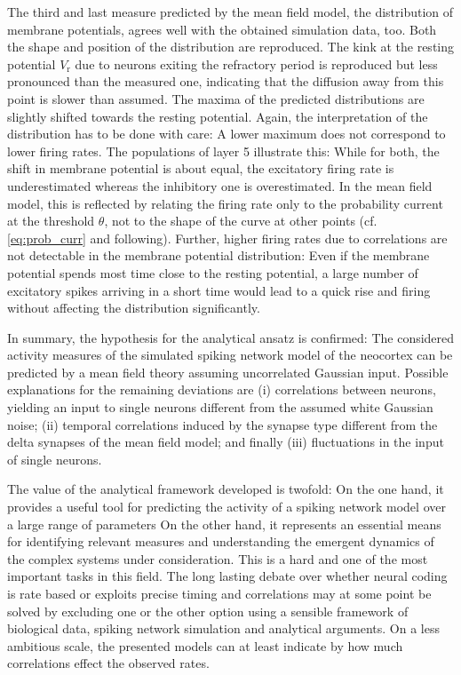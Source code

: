 The third and last measure predicted by the mean field model, the distribution of 
membrane potentials, agrees well with the obtained simulation data, too. 
Both the shape and position of the distribution are reproduced.
The kink at the resting potential $V_\text{r}$ due to neurons exiting the 
refractory period is reproduced but less pronounced than the measured one, indicating that the diffusion
away from this point is slower than assumed. 
The maxima of the predicted distributions are slightly 
shifted towards the resting potential. 
Again, the interpretation of the distribution has to be done with care:
A lower maximum does not correspond to lower firing rates. 
The populations of layer 5 illustrate this: While for both, the shift in membrane 
potential is about equal, the excitatory firing rate is underestimated whereas the 
inhibitory one is overestimated. 
In the mean field model, this is reflected by relating the firing rate 
only to the probability current at the threshold $\theta$, not to the 
shape of the curve at other points (cf. \autoref{eq:prob_curr} and following).
Further, higher firing rates due to correlations are not detectable in the 
membrane potential distribution: 
Even if the membrane potential spends most time close to the resting potential, 
a large number of excitatory spikes arriving in a short time would lead to a quick rise and
firing without affecting the distribution significantly.  


In summary, the hypothesis for the analytical ansatz is confirmed: 
The considered activity measures of the simulated spiking network model of the neocortex 
can be predicted by a mean field theory assuming uncorrelated Gaussian input.
Possible explanations for the remaining deviations are (i) correlations between neurons, 
yielding an input to single neurons different from the assumed white Gaussian noise;
(ii) temporal correlations induced by the synapse type different from the 
delta synapses of the mean field model; and finally (iii) fluctuations in the 
input of single neurons. 

The value of the analytical framework developed is twofold: On the one hand, 
it provides a useful tool for predicting the activity of a spiking network model
over a large range of parameters 
On the other hand, it represents an
essential means for identifying relevant measures and understanding the emergent 
dynamics of the complex systems under consideration. This is a hard and one of the 
most important tasks in this field. 
The long lasting
debate over whether neural coding is rate based or exploits precise timing and correlations
may at some point be solved by
excluding one or the other option using a sensible framework
of biological data, spiking network simulation and analytical arguments. 
On a less ambitious scale, the presented models can at least indicate by how much 
correlations effect the observed rates. 

